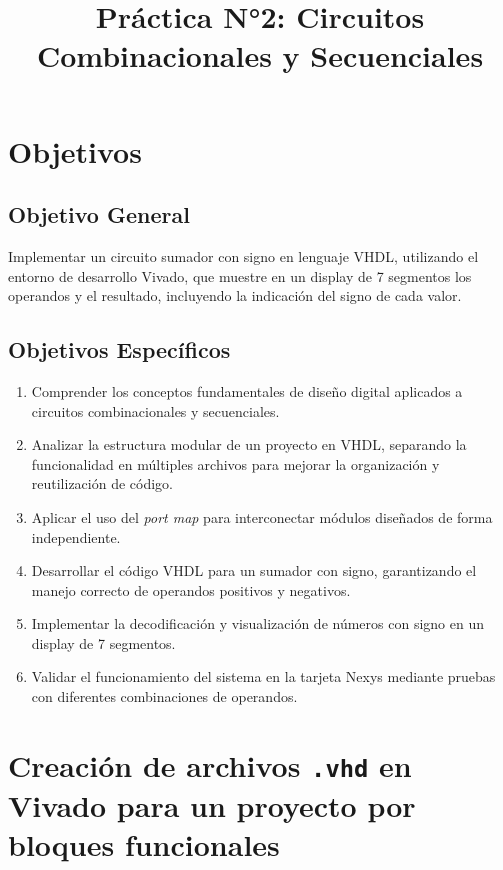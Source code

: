 \documentclass[a4paper,12pt]{article}
\title{Práctica N°2: Circuitos Combinacionales y Secuenciales}
\date{}
\begin{document}
\maketitle
\tableofcontents
\newpage

\section*{Objetivos}

\subsection*{Objetivo General}
Implementar un circuito sumador con signo en lenguaje VHDL, utilizando el entorno de desarrollo Vivado, que muestre en un display de 7 segmentos los operandos y el resultado, incluyendo la indicación del signo de cada valor.

\subsection*{Objetivos Específicos}
\begin{enumerate}
    \item Comprender los conceptos fundamentales de diseño digital aplicados a circuitos combinacionales y secuenciales.
    \item Analizar la estructura modular de un proyecto en VHDL, separando la funcionalidad en múltiples archivos para mejorar la organización y reutilización de código.
    \item Aplicar el uso del \textit{port map} para interconectar módulos diseñados de forma independiente.
    \item Desarrollar el código VHDL para un sumador con signo, garantizando el manejo correcto de operandos positivos y negativos.
    \item Implementar la decodificación y visualización de números con signo en un display de 7 segmentos.
    \item Validar el funcionamiento del sistema en la tarjeta Nexys mediante pruebas con diferentes combinaciones de operandos.
\end{enumerate}

\section{Creación de archivos \texttt{.vhd} en Vivado para un proyecto por bloques funcionales}
\label{sec:creacion-vhd-bloques}
\end{document}

